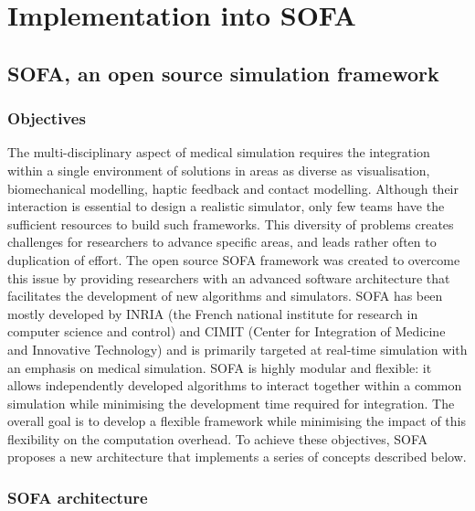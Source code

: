 	
\section{Implementation into SOFA}

	\subsection{SOFA, an open source simulation framework}	\label{chap6:SOFA}

\subsubsection*{Objectives}
The multi-disciplinary aspect of medical simulation requires the integration within a single environment of solutions in areas as diverse as visualisation, biomechanical modelling, haptic feedback and contact modelling. Although their interaction is essential to design a realistic simulator, only few teams have the sufficient resources to build such frameworks. This diversity of problems creates challenges for researchers to advance specific areas, and leads rather often to duplication of effort. The open source SOFA framework \citep{Allard07} was created to overcome this issue by providing researchers with an advanced software architecture that facilitates the development of new algorithms and simulators. SOFA has been mostly developed by INRIA (the French national institute for research in computer science and control) and CIMIT (Center for Integration of Medicine and Innovative Technology) and is primarily targeted at real-time simulation with an emphasis on medical simulation. SOFA is highly modular and flexible: it allows independently developed algorithms to interact together within a common simulation while minimising the development time required for integration. The overall goal is to develop a flexible framework while minimising the impact of this flexibility on the computation overhead. To achieve these objectives, SOFA proposes a new architecture that implements a series of concepts described below. 

\subsubsection*{SOFA architecture}

